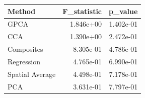 \begin{tabular}{lrr}
\toprule
Method & F_statistic & p_value \\
\midrule
GPCA & 1.846e+00 & 1.402e-01 \\
CCA & 1.390e+00 & 2.472e-01 \\
Composites & 8.305e-01 & 4.786e-01 \\
Regression & 4.765e-01 & 6.990e-01 \\
Spatial Average & 4.498e-01 & 7.178e-01 \\
PCA & 3.631e-01 & 7.797e-01 \\
\bottomrule
\end{tabular}
